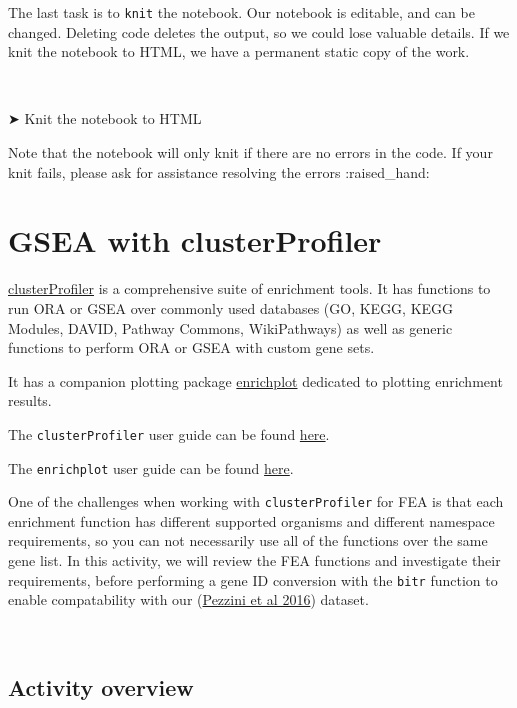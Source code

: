 \documentclass[
]{book}
\begin{document}
The last task is to \texttt{knit} the notebook. Our notebook is editable, and can be changed. Deleting code deletes the output, so we could lose valuable details. If we knit the notebook to HTML, we have a permanent static copy of the work.

~

➤ Knit the notebook to HTML

Note that the notebook will only knit if there are no errors in the code. If your knit fails, please ask for assistance resolving the errors :raised\_hand:

\hypertarget{gsea-with-clusterprofiler}{%
\chapter{GSEA with clusterProfiler}\label{gsea-with-clusterprofiler}}

\href{https://bioconductor.org/packages/release/bioc/html/clusterProfiler.html}{clusterProfiler} is a comprehensive suite of enrichment tools. It has functions to run ORA or GSEA over commonly used databases (GO, KEGG, KEGG Modules, DAVID, Pathway Commons, WikiPathways) as well as generic functions to perform ORA or GSEA with custom gene sets.

It has a companion plotting package \href{https://www.bioconductor.org/packages/release/bioc/html/enrichplot.html}{enrichplot} dedicated to plotting enrichment results.

The \texttt{clusterProfiler} user guide can be found \href{https://bioconductor.org/packages/devel/bioc/manuals/clusterProfiler/man/clusterProfiler.pdf}{here}.

The \texttt{enrichplot} user guide can be found \href{https://www.bioconductor.org/packages/devel/bioc/manuals/enrichplot/man/enrichplot.pdf}{here}.

One of the challenges when working with \texttt{clusterProfiler} for FEA is that each enrichment function has different supported organisms and different namespace requirements, so you can not necessarily use all of the functions over the same gene list. In this activity, we will review the FEA functions and investigate their requirements, before performing a gene ID conversion with the \texttt{bitr} function to enable compatability with our (\href{https://link.springer.com/article/10.1007/s10571-016-0403-y}{Pezzini et al 2016}) dataset.

~

\hypertarget{activity-overview-1}{%
\section{Activity overview}\label{activity-overview-1}}
\end{document}
